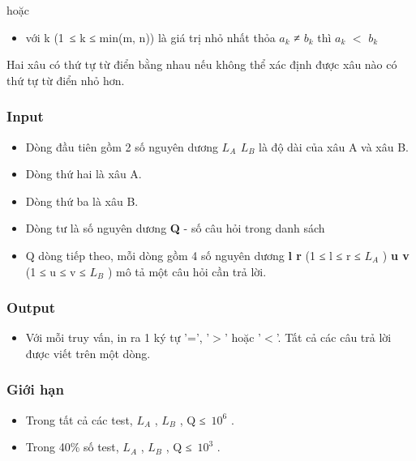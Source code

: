    hoặc  
\begin{itemize}
	\item     với k (1 ≤ k ≤ min(m, n)) là giá trị nhỏ nhất thỏa $a_{k}$    ≠ $b_{k}$    thì $a_{k}$    $<$ $b_{k}$
\end{itemize}

   Hai xâu có thứ tự từ điển bằng nhau nếu không thể xác định được xâu nào có thứ tự từ điển nhỏ hơn.  
\begin{itemize}
\end{itemize}

\subsubsection{   Input  }
\begin{itemize}
	\item     Dòng đầu tiên gồm 2 số nguyên dương    \textbf{     $L_{A}$     $L_{B}$}    là độ dài của xâu A và xâu B.   
	\item     Dòng thứ hai là xâu A.   
	\item     Dòng thứ ba là xâu B.   
	\item     Dòng tư là số nguyên dương    \textbf{     Q    }    - số câu hỏi trong danh sách   
	\item     Q dòng tiếp theo, mỗi dòng gồm 4 số nguyên dương    \textbf{     l r    }    (1 ≤ l ≤ r ≤ $L_{A}$    )    \textbf{     u v    }    (1 ≤ u ≤ v ≤ $L_{B}$    ) mô tả một câu hỏi cần trả lời.   
\end{itemize}

\subsubsection{   Output  }
\begin{itemize}
	\item     Với mỗi truy vấn, in ra 1 ký tự '=', '$>$' hoặc '$<$'. Tất cả các câu trả lời được viết trên một dòng.   
\end{itemize}

\subsubsection{   Giới hạn  }
\begin{itemize}
	\item     Trong tất cả các test, $L_{A}$    , $L_{B}$    , Q ≤ $10^{6}$    .   
	\item     Trong 40\% số test, $L_{A}$    , $L_{B}$    , Q ≤ $10^{3}$    .   
\end{itemize}

